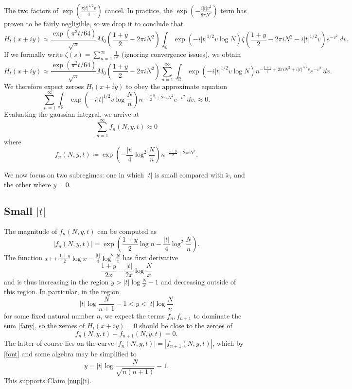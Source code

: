 \documentclass[a4paper,11pt,twoside]{amsart}
\newcommand\R{\mathbb{R}}
\begin{document}
The two factors of $\exp( \frac{\pi |t|^{1/2} v}{4} )$ cancel.  In practice, the $\exp(-\frac{i|t|v^2}{8\pi N^2})$ term has proven to be fairly negligible, so we drop it to conclude that
$$ H_t(x+iy) \approx \frac{\exp( \pi^2 t / 64)}{\sqrt{\pi}} M_0(\frac{1+y}{2}-2\pi i N^2) \int_\R \exp( -i |t|^{1/2} v \log N ) \zeta(\frac{1+y}{2}-2\pi i N^2 - i |t|^{1/2} v) e^{-v^2}\ dv.$$
If we formally write $\zeta(s) = \sum_{n=1}^\infty \frac{1}{n^s}$ (ignoring convergence issues), we obtain
$$
 H_t(x+iy) \approx \frac{\exp( \pi^2 t / 64)}{\sqrt{\pi}} M_0(\frac{1+y}{2}-2\pi i N^2) \sum_{n=1}^\infty \int_\R \exp( -i |t|^{1/2} v \log N ) n^{-\frac{1+y}{2}+2\pi i N^2 + i |t|^{1/2} v} e^{-v^2}\ dv.
$$
We therefore expect zeroes $H_t(x+iy)$ to obey the approximate equation
$$\sum_{n=1}^\infty \int_\R \exp( -i |t|^{1/2} v \log\frac{N}{n} ) n^{-\frac{1+y}{2}+2\pi i N^2} e^{-v^2}\ dv.
\approx 0.$$
Evaluating the gaussian integral, we arrive at
\begin{equation}\label{fany}
 \sum_{n=1}^\infty f_n(N,y,t) \approx 0 
\end{equation}
where
\begin{equation}\label{fn-def}
 f_n(N,y,t) \coloneqq \exp( -\frac{|t|}{4} \log^2 \frac{N}{n} ) n^{-\frac{1+y}{2}+2\pi i N^2}.
\end{equation}

We now focus on two subregimes: one in which $|t|$ is small compared with $\tilde x$, and the other where $y=0$.

\subsection{Small $|t|$} 

The magnitude of $f_n(N,y,t)$ can be computed as
\begin{equation}\label{font}
 |f_n(N,y,t)| = \exp( \frac{1+y}{2} \log n -\frac{|t|}{4} \log^2 \frac{N}{n} ).
\end{equation}
The function $x \mapsto \frac{1+y}{2} \log x -\frac{|t|}{4} \log^2 \frac{N}{x}$ has first derivative
$$ \frac{1+y}{2x} - \frac{|t|}{2x} \log \frac{N}{x}$$
and is thus increasing in the region $y > |t| \log \frac{N}{x} - 1$ and decreasing outside of this region.  In particular, in the region
$$ |t| \log \frac{N}{n+1} - 1 < y < |t| \log \frac{N}{n}$$
for some fixed natural number $n$, we expect the terms $f_n, f_{n+1}$ to dominate the sum \eqref{fany}, so the zeroes of $H_t(x+iy)=0$ should be close to the zeroes of
$$ f_n(N,y,t) + f_{n+1}(N,y,t) = 0.$$
The latter of course lies on the curve $|f_n(N,y,t)| = |f_{n+1}(N,y,t)|$, which by \eqref{font} and some algebra may be simplified to
$$ y = |t| \log \frac{N}{\sqrt{n(n+1)}} - 1.$$
This supports Claim \ref{nup}(i).
\end{document}
